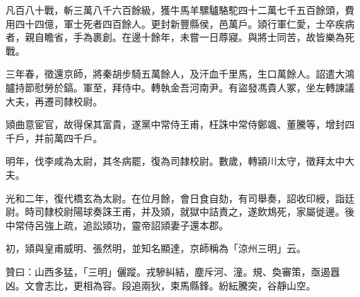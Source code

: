 \begin{pinyinscope}
凡百八十戰，斬三萬八千六百餘級，獲牛馬羊騾驢駱駝四十二萬七千五百餘頭，費用四十四億，軍士死者四百餘人。更封新豐縣侯，邑萬戶。熲行軍仁愛，士卒疾病者，親自瞻省，手為裹創。在邊十餘年，未嘗一日蓐寢。與將士同苦，故皆樂為死戰。

三年春，徵還京師，將秦胡步騎五萬餘人，及汗血千里馬，生口萬餘人。詔遣大鴻臚持節慰勞於鎬。軍至，拜侍中。轉執金吾河南尹。有盜發馮貴人冢，坐左轉諫議大夫，再遷司隸校尉。

熲曲意宦官，故得保其富貴，遂黨中常侍王甫，枉誅中常侍鄭颯、董騰等，增封四千戶，并前萬四千戶。

明年，伐李咸為太尉，其冬病罷，復為司隸校尉。數歲，轉潁川太守，徵拜太中大夫。

光和二年，復代橋玄為太尉。在位月餘，會日食自劾，有司舉奏，詔收印綬，詣廷尉。時司隸校尉陽球奏誅王甫，并及熲，就獄中詰責之，遂飲鴆死，家屬徙邊。後中常侍呂強上疏，追訟熲功，靈帝詔熲妻子還本郡。

初，熲與皇甫威明、張然明，並知名顯達，京師稱為「涼州三明」云。

贊曰：山西多猛，「三明」儷蹤。戎驂糾結，塵斥河、潼。規、奐審策，亟遏囂凶。文會志比，更相為容。段追兩狄，束馬縣鋒。紛紜騰突，谷靜山空。


\end{pinyinscope}
